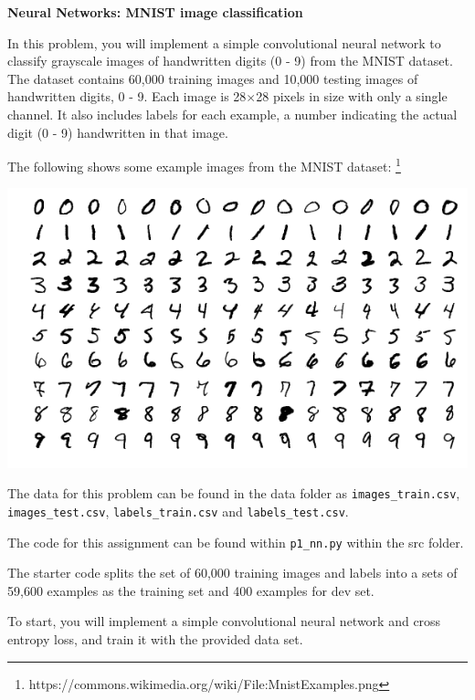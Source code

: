 \clearpage
\item {} {\bf Neural Networks: MNIST image classification}

In this problem, you will implement a simple convolutional neural network
to classify grayscale images of handwritten digits (0 - 9) from
the MNIST dataset. The dataset contains 60,000 training images and
10,000 testing images of handwritten digits, 0 - 9. Each image is
28$\times$28 pixels in size with only a single channel. It also includes labels for each example, a number
indicating the actual digit (0 - 9) handwritten in that image.

The following shows some example images from the MNIST dataset: \footnote{https://commons.wikimedia.org/wiki/File:MnistExamples.png}

\includegraphics[scale=0.5]{01-nn-mnist/mnist_plot.png} 


The data for this problem can be found in the data folder as \texttt{images\_train.csv}, \texttt{images\_test.csv}, \texttt{labels\_train.csv} and \texttt{labels\_test.csv}.


The code for this assignment can be found within \texttt{p1\_nn.py} within the src folder.

The starter code splits the set
of 60,000 training images and labels into a sets of 59,600 examples as
the training set and 400 examples for dev set.

To start, you will implement a simple convolutional neural network
and cross entropy loss, and train it with the provided data set. 

